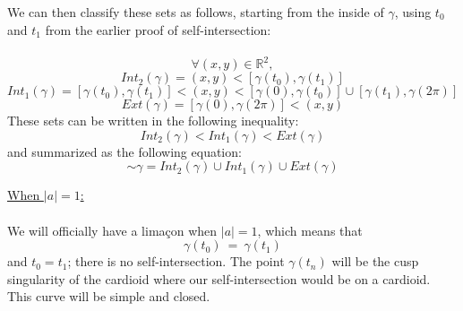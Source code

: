 \documentclass[12pt]{article}
\begin{document}
  We can then classify these sets as follows, starting from the inside of $\gamma$, using $t_0$ and $t_1$ from the earlier proof of self-intersection:\\\\
  $$
\forall (x,y) \in \mathbb{R}^2,
  $$
  $$
  Int_2(\gamma) = (x,y) < [\gamma(t_0),\gamma(t_1)]
  $$
  $$
  Int_1(\gamma) = [\gamma(t_0),\gamma(t_1)] < (x,y) < [\gamma(0),\gamma(t_0)] \cup [\gamma(t_1),\gamma(2\pi)]
  $$
    $$
  Ext(\gamma) = [\gamma(0),\gamma(2\pi)] < (x,y)
  $$
  \clearpage
These sets can be written in the following inequality:
$$
Int_2(\gamma) < Int_1(\gamma) < Ext(\gamma)
$$
and summarized as the following equation:
$$
\sim\gamma=Int_2(\gamma) \cup Int_1(\gamma) \cup Ext(\gamma)
$$

\noindent
\underline{When $|a| = 1$:}\\\\
\indent
We will officially have a limaçon when $|a| = 1$, which means that\\
$$
\gamma(t_0) \ = \ \gamma(t_1)
$$
and $t_0 = t_1$; there is no self-intersection. The point $\gamma(t_n)$ will be the cusp singularity of the cardioid where our self-intersection would be on a cardioid. This curve will be simple and closed.\\
  
\end{document}
